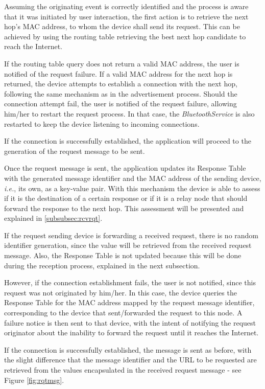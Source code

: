 Assuming the originating event is correctly identified and the process is aware that it was initiated by user interaction, the first action is to retrieve the next hop's \gls{MAC} address, to whom the device shall send its request. This can be achieved by using the routing table retrieving the best next hop candidate to reach the Internet.

If the routing table query does not return a valid \gls{MAC} address, the user is notified of the request failure. If a valid \gls{MAC} address for the next hop is returned, the device attempts to establish a connection with the next hop, following the same mechanism as in the advertisement process. Should the connection attempt fail, the user is notified of the request failure, allowing him/her to restart the request process. In that case, the \textit{BluetoothService} is also restarted to keep the device listening to incoming connections.

If the connection is successfully established, the application will proceed to the generation of the request message to be sent.

Once the request message is sent, the application updates its Response Table with the generated message identifier and the \gls{MAC} address of the sending device, \textit{i.e.}, its own, as a key-value pair. With this mechanism the device is able to assess if it is the destination of a certain response or if it is a relay node that should forward the response to the next hop. This assessment will be presented and explained in \ref{subsubsec:rcvrqt}.

If the request sending device is forwarding a received request, there is no random identifier generation, since the value will be retrieved from the received request message. Also, the Response Table is not updated because this will be done during the reception process, explained in the next subsection.

However, if the connection establishment fails, the user is not notified, since this request was not originated by him/her. In this case, the device queries the Response Table for the \gls{MAC} address mapped by the request message identifier, corresponding to the device that sent/forwarded the request to this node. A failure notice is then sent to that device, with the intent of notifying the request originator about the inability to forward the request until it reaches the Internet.

If the connection is successfully established, the message is sent as before, with the slight difference that the message identifier and the \gls{URL} to be requested are retrieved from the values encapsulated in the received request message - see Figure \ref{fig:rqtmsg}.

